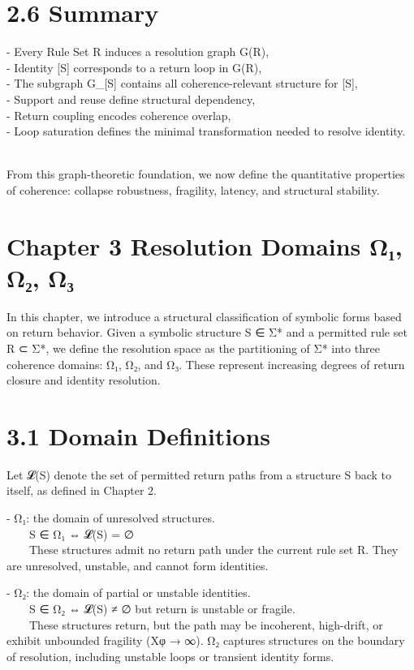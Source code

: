 \section{2.6 \textbar{} Summary}\label{summary-1}

- Every Rule Set R induces a resolution graph G(R),\\
- Identity {[}S{]} corresponds to a return loop in G(R),\\
- The subgraph G\_{[}S{]} contains all coherence-relevant structure for
{[}S{]},\\
- Support and reuse define structural dependency,\\
- Return coupling encodes coherence overlap,\\
- Loop saturation defines the minimal transformation needed to resolve
identity.\\
\strut \\
From this graph-theoretic foundation, we now define the quantitative
properties of coherence: collapse robustness, fragility, latency, and
structural stability.

\section{Chapter 3 \textbar{} Resolution Domains Ω₁, Ω₂,
Ω₃}\label{chapter-3-resolution-domains-ux3c9ux2081-ux3c9ux2082-ux3c9ux2083}

In this chapter, we introduce a structural classification of symbolic
forms based on return behavior. Given a symbolic structure S ∈ Σ* and a
permitted rule set R ⊂ Σ*, we define the resolution space as the
partitioning of Σ* into three coherence domains: Ω₁, Ω₂, and Ω₃. These
represent increasing degrees of return closure and identity resolution.

\section{3.1 \textbar{} Domain Definitions}\label{domain-definitions}

Let 𝓛(S) denote the set of permitted return paths from a structure S
back to itself, as defined in Chapter 2.

- Ω₁: the domain of unresolved structures.\\
  S ∈ Ω₁ ⇔ 𝓛(S) = ∅\\
  These structures admit no return path under the current rule set R.
They are unresolved, unstable, and cannot form identities.

- Ω₂: the domain of partial or unstable identities.\\
  S ∈ Ω₂ ⇔ 𝓛(S) ≠ ∅ but return is unstable or fragile.\\
  These structures return, but the path may be incoherent, high-drift,
or exhibit unbounded fragility (Xφ → ∞). Ω₂ captures structures on the
boundary of resolution, including unstable loops or transient identity
forms.

